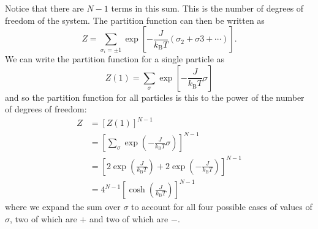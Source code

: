 \documentclass[a4paper]{article}
\newcommand{\boltzmann}{k_\mathrm{B}}
\begin{document}
    Notice that there are \(N - 1\) terms in this sum.
    This is the number of degrees of freedom of the system.
    The partition function can then be written as
    \[Z = \sum_{\sigma_i = \pm 1} \exp\left[-\frac{J}{\boltzmann T}(\sigma_2 + \sigma3 + \dotsb)\right].\]
    We can write the partition function for a single particle as
    \[Z(1) = \sum_{\sigma} \exp\left[-\frac{J}{\boltzmann T}\sigma\right]\]
    and so the partition function for all particles is this to the power of the number of degrees of freedom:
    \begin{align*}
        Z &= [Z(1)]^{N - 1}\\
        &= \left[\sum_{\sigma} \exp\left(-\frac{J}{\boltzmann T}\sigma\right)\right]^{N-1}\\
        &= \left[2\exp\left(\frac{J}{\boltzmann T}\right) + 2\exp\left(-\frac{J}{\boltzmann T}\right)\right]^{N-1}\\
        &= 4^{N - 1} \left[\cosh\left(\frac{J}{\boltzmann T}\right)\right]^{N - 1}
    \end{align*}
    where we expand the sum over \(\sigma\) to account for all four possible cases of values of \(\sigma\), two of which are \(+\) and two of which are \(-\).
    
\end{document}
